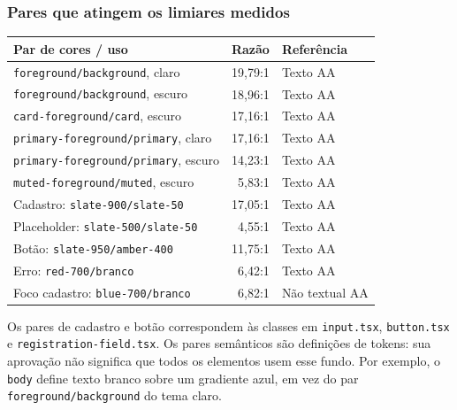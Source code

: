 \documentclass[12pt,a4paper]{article}
\begin{document}
\subsubsection{Pares que atingem os limiares medidos}
\begin{center}
\small
\begin{tabularx}{\textwidth}{>{\raggedright\arraybackslash}X r l}
\hline
\textbf{Par de cores / uso} & \textbf{Razão} & \textbf{Referência} \\
\hline
\texttt{foreground/background}, claro & 19,79:1 & Texto AA \\
\texttt{foreground/background}, escuro & 18,96:1 & Texto AA \\
\texttt{card-foreground/card}, escuro & 17,16:1 & Texto AA \\
\texttt{primary-foreground/primary}, claro & 17,16:1 & Texto AA \\
\texttt{primary-foreground/primary}, escuro & 14,23:1 & Texto AA \\
\texttt{muted-foreground/muted}, escuro & 5,83:1 & Texto AA \\
Cadastro: \texttt{slate-900/slate-50} & 17,05:1 & Texto AA \\
Placeholder: \texttt{slate-500/slate-50} & 4,55:1 & Texto AA \\
Botão: \texttt{slate-950/amber-400} & 11,75:1 & Texto AA \\
Erro: \texttt{red-700/branco} & 6,42:1 & Texto AA \\
Foco cadastro: \texttt{blue-700/branco} & 6,82:1 & Não textual AA \\
\hline
\end{tabularx}
\end{center}

Os pares de cadastro e botão correspondem às classes em \texttt{input.tsx}, \texttt{button.tsx} e \texttt{registration-field.tsx}. Os pares semânticos são definições de tokens: sua aprovação não significa que todos os elementos usem esse fundo. Por exemplo, o \texttt{body} define texto branco sobre um gradiente azul, em vez do par \texttt{foreground/background} do tema claro.
\end{document}
